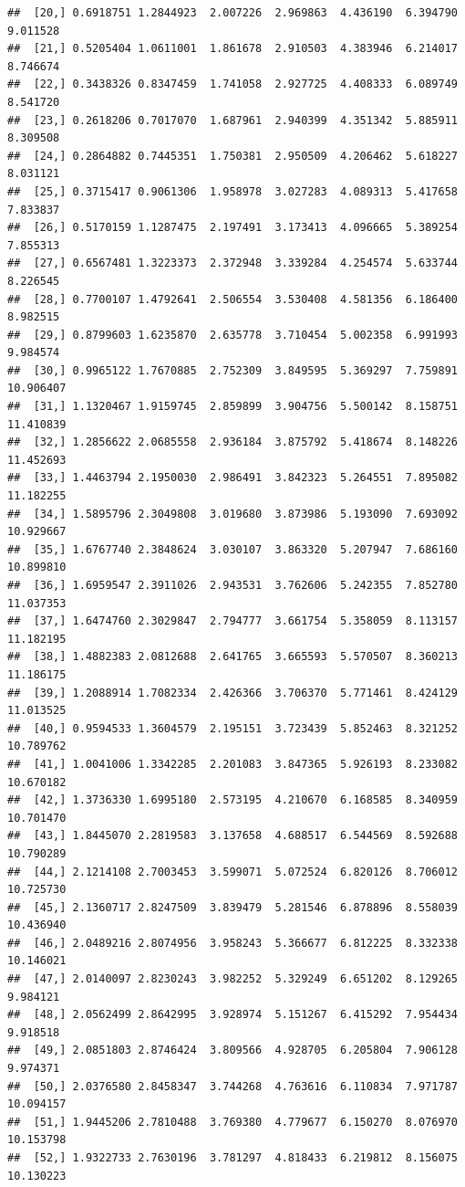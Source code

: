 \documentclass{article}\usepackage[]{graphicx}\usepackage[]{color}
\makeatletter
\newenvironment{kframe}{%
 \def\at@end@of@kframe{}%
 \ifinner\ifhmode%
  \def\at@end@of@kframe{\end{minipage}}%
  \begin{minipage}{\columnwidth}%
 \fi\fi%
 \def\FrameCommand##1{\hskip\@totalleftmargin \hskip-\fboxsep
 \colorbox{shadecolor}{##1}\hskip-\fboxsep
     \hskip-\linewidth \hskip-\@totalleftmargin \hskip\columnwidth}%
 \MakeFramed {\advance\hsize-\width
   \@totalleftmargin\z@ \linewidth\hsize
   \@setminipage}}%
 {\par\unskip\endMakeFramed%
 \at@end@of@kframe}
\newenvironment{knitrout}{}{} %
\makeatother
\begin{document}
\begin{knitrout}
\begin{kframe}
\begin{verbatim}
##  [20,] 0.6918751 1.2844923  2.007226  2.969863  4.436190  6.394790  9.011528
##  [21,] 0.5205404 1.0611001  1.861678  2.910503  4.383946  6.214017  8.746674
##  [22,] 0.3438326 0.8347459  1.741058  2.927725  4.408333  6.089749  8.541720
##  [23,] 0.2618206 0.7017070  1.687961  2.940399  4.351342  5.885911  8.309508
##  [24,] 0.2864882 0.7445351  1.750381  2.950509  4.206462  5.618227  8.031121
##  [25,] 0.3715417 0.9061306  1.958978  3.027283  4.089313  5.417658  7.833837
##  [26,] 0.5170159 1.1287475  2.197491  3.173413  4.096665  5.389254  7.855313
##  [27,] 0.6567481 1.3223373  2.372948  3.339284  4.254574  5.633744  8.226545
##  [28,] 0.7700107 1.4792641  2.506554  3.530408  4.581356  6.186400  8.982515
##  [29,] 0.8799603 1.6235870  2.635778  3.710454  5.002358  6.991993  9.984574
##  [30,] 0.9965122 1.7670885  2.752309  3.849595  5.369297  7.759891 10.906407
##  [31,] 1.1320467 1.9159745  2.859899  3.904756  5.500142  8.158751 11.410839
##  [32,] 1.2856622 2.0685558  2.936184  3.875792  5.418674  8.148226 11.452693
##  [33,] 1.4463794 2.1950030  2.986491  3.842323  5.264551  7.895082 11.182255
##  [34,] 1.5895796 2.3049808  3.019680  3.873986  5.193090  7.693092 10.929667
##  [35,] 1.6767740 2.3848624  3.030107  3.863320  5.207947  7.686160 10.899810
##  [36,] 1.6959547 2.3911026  2.943531  3.762606  5.242355  7.852780 11.037353
##  [37,] 1.6474760 2.3029847  2.794777  3.661754  5.358059  8.113157 11.182195
##  [38,] 1.4882383 2.0812688  2.641765  3.665593  5.570507  8.360213 11.186175
##  [39,] 1.2088914 1.7082334  2.426366  3.706370  5.771461  8.424129 11.013525
##  [40,] 0.9594533 1.3604579  2.195151  3.723439  5.852463  8.321252 10.789762
##  [41,] 1.0041006 1.3342285  2.201083  3.847365  5.926193  8.233082 10.670182
##  [42,] 1.3736330 1.6995180  2.573195  4.210670  6.168585  8.340959 10.701470
##  [43,] 1.8445070 2.2819583  3.137658  4.688517  6.544569  8.592688 10.790289
##  [44,] 2.1214108 2.7003453  3.599071  5.072524  6.820126  8.706012 10.725730
##  [45,] 2.1360717 2.8247509  3.839479  5.281546  6.878896  8.558039 10.436940
##  [46,] 2.0489216 2.8074956  3.958243  5.366677  6.812225  8.332338 10.146021
##  [47,] 2.0140097 2.8230243  3.982252  5.329249  6.651202  8.129265  9.984121
##  [48,] 2.0562499 2.8642995  3.928974  5.151267  6.415292  7.954434  9.918518
##  [49,] 2.0851803 2.8746424  3.809566  4.928705  6.205804  7.906128  9.974371
##  [50,] 2.0376580 2.8458347  3.744268  4.763616  6.110834  7.971787 10.094157
##  [51,] 1.9445206 2.7810488  3.769380  4.779677  6.150270  8.076970 10.153798
##  [52,] 1.9322733 2.7630196  3.781297  4.818433  6.219812  8.156075 10.130223

\end{verbatim}
\end{kframe}
\end{knitrout}
\end{document}
